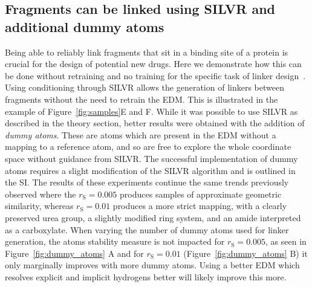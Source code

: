 \documentclass[journal=jacsat,manuscript=article]{achemso}
\begin{document}
\subsection{Fragments can be linked using SILVR and additional dummy atoms}
\label{sec:linker}
Being able to reliably link fragments that sit in a binding site of a protein is crucial for the design of potential new drugs. Here we demonstrate how this can be done  without retraining and no training for the specific task of linker design~\cite{huang20223dlinker,imrie2020deep}. Using conditioning through SILVR allows the generation of linkers between fragments without the need to retrain the EDM. This is illustrated in the example of Figure~\ref{fig:samples}E and F. While it was possible to use SILVR as described in the theory section, better results were obtained with the addition of \textit{dummy atoms}. These are atoms which are present in the EDM without a mapping to a reference atom, and so are free to explore the whole coordinate space without guidance from SILVR. The successful implementation of dummy atoms requires a slight modification of the SILVR algorithm and is outlined in the SI. The results of these experiments continue the same trends previously observed where the $r_{\mathrm{S}}=0.005$ produces samples of approximate geometric similarity, whereas $r_{\mathrm{S}}=0.01$ produces a more strict mapping, with a clearly preserved urea group, a slightly modified ring system, and an amide interpreted as a carboxylate. When varying the number of dummy atoms used for linker generation, the atoms stability measure is not impacted for $r_{\mathrm{S}}=0.005$, as seen in Figure~\ref{fig:dummy_atoms} A and for $r_{\mathrm{S}}=0.01$ (Figure~\ref{fig:dummy_atoms} B) it only marginally improves with more dummy atoms. Using a better EDM which resolves explicit and implicit hydrogens better will likely improve this more. 

\end{document}
